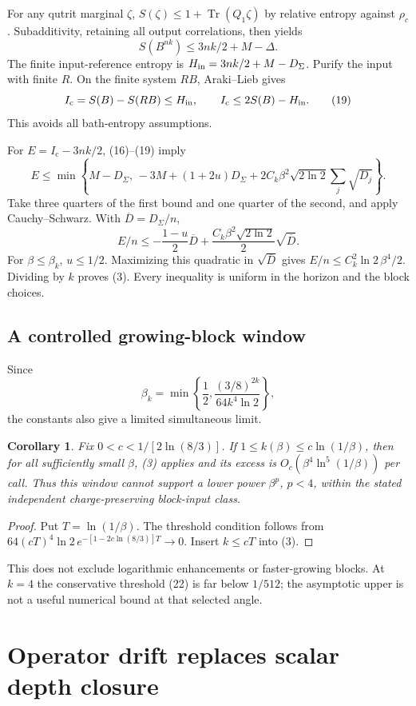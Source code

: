 \documentclass[11pt]{article}
\newtheorem{corollary}[theorem]{Corollary}
\newcommand{\Tr}{\operatorname{Tr}}
\newcommand{\Ic}{I_{\mathrm c}}
\begin{document}
For any qutrit marginal $\zeta$,
$S(\zeta)\le1+\Tr(Q_1\zeta)$ by relative entropy against $\rho_c$.
Subadditivity, retaining all output correlations, then yields
\[
 S(B^{nk})\le3nk/2+M-\Delta.
 \tag{18}
\]
The finite input-reference entropy is
$H_{\rm in}=3nk/2+M-D_\Sigma$. Purify the input with finite $R$.
On the finite system $RB$, Araki--Lieb gives
\[
 \Ic=S(B)-S(RB)\le H_{\rm in},\qquad
 \Ic\le2S(B)-H_{\rm in}.
 \tag{19}
\]
This avoids all bath-entropy assumptions.

For $E=\Ic-3nk/2$, (16)--(19) imply
\[
 E\le\min\left\{M-D_\Sigma,\,
 -3M+(1+2u)D_\Sigma+
 2C_k\beta^2\sqrt{2\ln2}\sum_j\sqrt{D_j}\right\}.
 \tag{20}
\]
Take three quarters of the first bound and one quarter of the second,
and apply Cauchy--Schwarz. With $\overline D=D_\Sigma/n$,
\[
 E/n\le-\frac{1-u}{2}\overline D
       +\frac{C_k\beta^2\sqrt{2\ln2}}2\sqrt{\overline D}.
 \tag{21}
\]
For $\beta\le\beta_k$, $u\le1/2$. Maximizing this quadratic in
$\sqrt{\overline D}$ gives
$E/n\le C_k^2\ln2\,\beta^4/2$. Dividing by $k$ proves (3).
Every inequality is uniform in the horizon and the block choices.

\subsection{A controlled growing-block window}

Since
\[
 \beta_k=\min\left\{\frac12,
 \frac{(3/8)^{2k}}{64k^4\ln2}\right\},
 \tag{22}
\]
the constants also give a limited simultaneous limit.
\begin{corollary}\label{cor:log}
Fix $0<c<1/[2\ln(8/3)]$. If
$1\le k(\beta)\le c\ln(1/\beta)$, then for all sufficiently small
$\beta$, (3) applies and its excess is
$O_c(\beta^4\ln^5(1/\beta))$ per call.
Thus this window cannot support a lower power $\beta^p$, $p<4$,
within the stated independent charge-preserving block-input class.
\end{corollary}
\begin{proof}
Put $T=\ln(1/\beta)$. The threshold condition follows from
$64(cT)^4\ln2\,e^{-[1-2c\ln(8/3)]T}\to0$.
Insert $k\le cT$ into (3).
\end{proof}
This does not exclude logarithmic enhancements or faster-growing blocks.
At $k=4$ the conservative threshold (22) is far below $1/512$;
the asymptotic upper is not a useful numerical bound at that selected angle.

\section{Operator drift replaces scalar depth closure}
\end{document}
